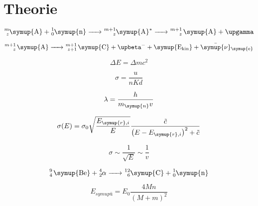 \section{Theorie}

\begin{equation}
\ce{^m_z\symup{A} + ^1_0\symup{n} -> ^{m+1}_z\symup{A}^{\ast} -> ^{m+1}_z \symup{A} + \upgamma }
\end{equation}

\begin{equation}
\ce{^{m+1}_z \symup{A} -> ^{m+1}_{z+1} \symup{C} + \upbeta^- + \symup{E_{kin}} + \bar{\symup{\nu}}_{\symup{e}}}
\end{equation}

\begin{equation}
\Delta E = \Delta m c^2
\end{equation}

\begin{equation}
\sigma = \frac{u}{nKd}
\end{equation}

\begin{equation}
\lambda = \frac{h}{m_{\symup{n}}v}
\end{equation}

\begin{equation}
\sigma(E) = \sigma_0 \sqrt{ \frac{E_{\symup{r},i}}{E} } \frac{\tilde{c}}{\left( E - E_{\symup{r},i} \right)^2 + \tilde{c}}
\end{equation}

\begin{equation}
   \sigma \sim \frac{1}{\sqrt{E}} \sim \frac{1}{v}
\end{equation}

\begin{equation}
\ce{ ^9_4 \symup{Be} + ^4_2$\alpha$ -> ^{12}_6\symup{C} + ^1_0\symup{n}}
\end{equation}

\begin{equation}
 E_{symup{ü}}  = E_0 \frac{4Mn}{\left( M + m \right)^2}
\end{equation}

